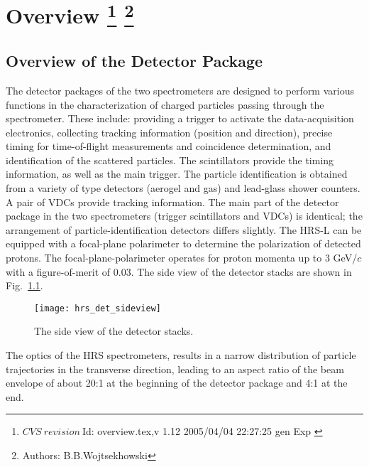 \chapter[Overview]{Overview
\label{chap:hrs-det}
\footnote{
  $CVS~revision~ $Id: overview.tex,v 1.12 2005/04/04 22:27:25 gen Exp $ $
}
\footnote{Authors: B.B.Wojtsekhowski }
}

\section{Overview of the Detector Package}

The detector packages of the two spectrometers are designed 
to perform various functions 
in the characterization of charged particles passing through the spectrometer. 
These include: providing a trigger to activate the data-acquisition 
electronics, collecting tracking information (position and direction), 
precise timing for time-of-flight measurements and coincidence determination, 
and identification of the scattered particles. 
The scintillators provide the timing information, as well as the
main trigger. The particle identification is obtained from a 
variety of \Cherenkov{}  type detectors (aerogel and gas) and 
lead-glass shower counters. 
A pair of VDCs provide tracking information.
The main part of the detector package in the two spectrometers 
(trigger scintillators and VDCs) is identical; 
the arrangement of particle-identification detectors differs slightly.
The HRS-L can be equipped with a focal-plane polarimeter to determine 
the polarization of detected protons.
The focal-plane-polarimeter operates for proton momenta up 
to 3 GeV/$c$ with a figure-of-merit of 0.03.
The side view of the detector stacks are shown in Fig.~\ref{fig:side-view}.
%
\begin{figure}[p]
\texttt{[image: hrs\_det\_sideview]}
\caption[The side view of the detector stacks]
{The side view of the detector stacks.}
\label{fig:side-view}
\end{figure}
%

The optics of the HRS spectrometers, results in a narrow distribution of 
particle trajectories in the transverse direction, leading 
to an aspect ratio of the beam envelope of about 20:1 at 
the beginning of the detector package and 4:1 at the end.

